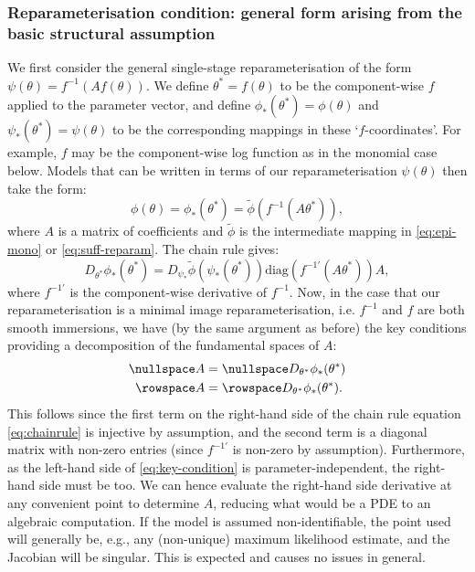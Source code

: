 \subsubsection{Reparameterisation condition: general form arising from the basic structural assumption}
We first consider the general single-stage reparameterisation of the form $\psi(\theta) = f^{-1}(A f(\theta))$. We define $\theta^* = f(\theta)$ to be the component-wise $f$ applied to the parameter vector, and define $\phi_*(\theta^*) = \phi(\theta)$ and $\psi_*(\theta^*) = \psi(\theta)$ to be the corresponding mappings in these `$f$-coordinates'. For example, $f$ may be the component-wise log function as in the monomial case below. Models that can be written in terms of our reparameterisation $\psi(\theta)$ then take the form:
\begin{equation}
\phi(\theta) =\phi_*(\theta^*) = \tilde{\phi}(f^{-1}(A\theta^*)),
\label{eq:reparam}
\end{equation}
where $A$ is a matrix of coefficients and $\tilde{\phi}$ is the intermediate mapping in \eqref{eq:epi-mono} or \eqref{eq:suff-reparam}. The chain rule gives:
\begin{equation}
D_{\theta^*} \phi_*(\theta^*) = D_{\psi_*} \tilde{\phi}(\psi_*(\theta^*))\text{diag}(f^{-1'}(A\theta^*))A,
\label{eq:chainrule}
\end{equation}
where $f^{-1'}$ is the component-wise derivative of $f^{-1}$. Now, in the case that our reparameterisation is a minimal image reparameterisation, i.e. $f^{-1}$ and $f$ are both smooth immersions, we have (by the same argument as before) the key conditions providing a decomposition of the fundamental spaces of $A$:
\begin{equation}
    \begin{aligned}
\nullspace A &= \nullspace D_{\theta^*}\phi_*(\theta^*)\\
\rowspace A &= \rowspace D_{\theta^*}\phi_*(\theta^*).
\end{aligned}
\label{eq:key-condition}
\end{equation}
This follows since the first term on the right-hand side of the chain rule equation \eqref{eq:chainrule} is injective by assumption, and the second term is a diagonal matrix with non-zero entries (since $f^{-1'}$ is non-zero by assumption). Furthermore, as the left-hand side of \eqref{eq:key-condition} is parameter-independent, the right-hand side must be too. We can hence evaluate the right-hand side derivative at any convenient point to determine $A$, reducing what would be a PDE to an algebraic computation. If the model is assumed non-identifiable, the point used will generally be, e.g., any (non-unique) maximum likelihood estimate, and the Jacobian will be singular. This is expected and causes no issues in general.


